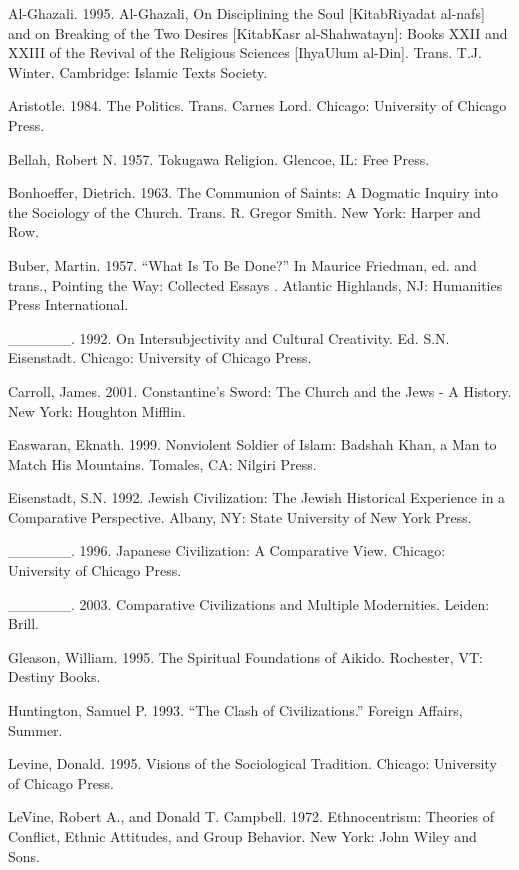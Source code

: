 \begin{list}{}{}
\item Al-Ghazali. 1995. Al-Ghazali, On Disciplining the Soul [KitabRiyadat al-nafs] and on Breaking of the Two Desires [KitabKasr al-Shahwatayn]: Books XXII and XXIII of the Revival of the Religious Sciences [IhyaUlum al-Din]. Trans. T.J. Winter. Cambridge: Islamic Texts Society.
\item Aristotle. 1984. The Politics. Trans. Carnes Lord. Chicago: University of Chicago Press.
\item Bellah, Robert N. 1957. Tokugawa Religion. Glencoe, IL: Free Press.
\item Bonhoeffer, Dietrich. 1963. The Communion of Saints: A Dogmatic Inquiry into the Sociology of the Church. Trans. R. Gregor Smith. New York: Harper and Row.
\item Buber, Martin. 1957. ``What Is To Be Done?'' In Maurice Friedman, ed. and trans., Pointing the Way: Collected Essays . Atlantic Highlands, NJ: Humanities Press International.
\item \_\_\_\_\_\_. 1992. On Intersubjectivity and Cultural Creativity. Ed. S.N. Eisenstadt. Chicago: University of Chicago Press.
\item Carroll, James. 2001. Constantine's Sword: The Church and the Jews - A History. New York: Houghton Mifflin. 
\item Easwaran, Eknath. 1999. Nonviolent Soldier of Islam: Badshah Khan, a Man to Match His Mountains. Tomales, CA: Nilgiri Press.
\item Eisenstadt, S.N. 1992. Jewish Civilization: The Jewish Historical Experience in a Comparative Perspective. Albany, NY: State University of New York Press.
\item \_\_\_\_\_\_. 1996. Japanese Civilization: A Comparative View. Chicago: University of Chicago Press.
\item \_\_\_\_\_\_. 2003. Comparative Civilizations and Multiple Modernities. Leiden: Brill.
\item Gleason, William. 1995. The Spiritual Foundations of Aikido. Rochester, VT: Destiny Books. 
\item Huntington, Samuel P. 1993. ``The Clash of Civilizations.'' Foreign Affairs, Summer. 
\item Levine, Donald. 1995. Visions of the Sociological Tradition. Chicago: University of Chicago Press. 
\item LeVine, Robert A., and Donald T. Campbell. 1972. Ethnocentrism: Theories of Conflict, Ethnic Attitudes, and Group Behavior. New York: John Wiley and Sons.

\end{list}
